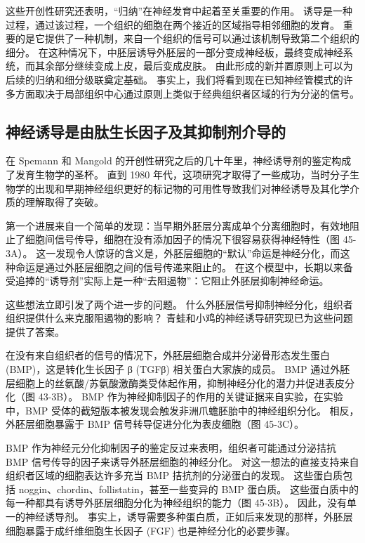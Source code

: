 这些开创性研究还表明，“归纳”在神经发育中起着至关重要的作用。 诱导是一种过程，通过该过程，一个组织的细胞在两个接近的区域指导相邻细胞的发育。 重要的是它提供了一种机制，来自一个组织的信号可以通过该机制导致第二个组织的细分。 在这种情况下，中胚层诱导外胚层的一部分变成神经板，最终变成神经系统，而其余部分继续变成上皮，最后变成皮肤。 由此形成的新并置原则上可以为后续的归纳和细分级联奠定基础。 事实上，我们将看到现在已知神经管模式的许多方面取决于局部组织中心通过原则上类似于经典组织者区域的行为分泌的信号。

\subsection{神经诱导是由肽生长因子及其抑制剂介导的}

在 Spemann 和 Mangold 的开创性研究之后的几十年里，神经诱导剂的鉴定构成了发育生物学的圣杯。 直到 1980 年代，这项研究才取得了一些成功，当时分子生物学的出现和早期神经组织更好的标记物的可用性导致我们对神经诱导及其化学介质的理解取得了突破。

第一个进展来自一个简单的发现：当早期外胚层分离成单个分离细胞时，有效地阻止了细胞间信号传导，细胞在没有添加因子的情况下很容易获得神经特性（图 45-3A）。 这一发现令人惊讶的含义是，外胚层细胞的“默认”命运是神经分化，而这种命运是通过外胚层细胞之间的信号传递来阻止的。 在这个模型中，长期以来备受追捧的“诱导剂”实际上是一种“去阻遏物”：它阻止外胚层抑制神经命运。

这些想法立即引发了两个进一步的问题。 什么外胚层信号抑制神经分化，组织者组织提供什么来克服阻遏物的影响？ 青蛙和小鸡的神经诱导研究现已为这些问题提供了答案。

在没有来自组织者的信号的情况下，外胚层细胞合成并分泌骨形态发生蛋白 (BMP)，这是转化生长因子 β (TGFβ) 相关蛋白大家族的成员。 BMP 通过外胚层细胞上的丝氨酸/苏氨酸激酶类受体起作用，抑制神经分化的潜力并促进表皮分化（图 43-3B）。 BMP 作为神经抑制因子的作用的关键证据来自实验，在实验中，BMP 受体的截短版本被发现会触发非洲爪蟾胚胎中的神经组织分化。 相反，外胚层细胞暴露于 BMP 信号转导促进分化为表皮细胞（图 45-3C）。

BMP 作为神经元分化抑制因子的鉴定反过来表明，组织者可能通过分泌拮抗 BMP 信号传导的因子来诱导外胚层细胞的神经分化。 对这一想法的直接支持来自组织者区域的细胞表达许多充当 BMP 拮抗剂的分泌蛋白的发现。 这些蛋白质包括 noggin、chordin、follistatin，甚至一些变异的 BMP 蛋白质。 这些蛋白质中的每一种都具有诱导外胚层细胞分化为神经组织的能力（图 45-3B）。 因此，没有单一的神经诱导剂。 事实上，诱导需要多种蛋白质，正如后来发现的那样，外胚层细胞暴露于成纤维细胞生长因子 (FGF) 也是神经分化的必要步骤。

